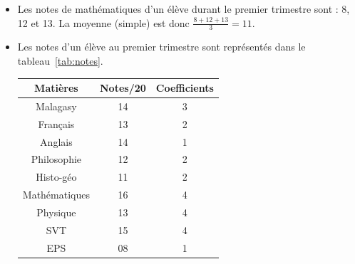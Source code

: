 \begin{defi}
\begin{itemize}
\begin{ex}
\begin{itemize}
                                                      \item Les notes de math\'ematiques d'un \'el\`eve durant le premier 
                                                            trimestre sont : 8, 12 et 13.
                                                            La moyenne (simple) est donc $\frac{8 + 12 + 13}{3} = 11$.
                                                      \item Les notes d'un \'el\`eve au premier trimestre sont repr\'esent\'es
                                                            dans le tableau~\ref{tab:notes}.
                                                            \begin{table}[H]
                                                                  \centering
                                                                  \begin{tabular}{|c|c|c|}
                                                                  \hline
                                                                        Mati\`eres        & Notes/20 & Coefficients \\
                                                                  \hline
                                                                        Malagasy          &    14    &     3        \\
                                                                        Fran\c{c}ais      &    13    &     2        \\
                                                                        Anglais           &    14    &     1        \\
                                                                        Philosophie       &    12    &     2        \\
                                                                        Histo-g\'eo       &    11    &     2        \\
                                                                        Math\'ematiques   &    16    &     4        \\
                                                                        Physique          &    13    &     4        \\
                                                                        SVT               &    15    &     4        \\
                                                                        EPS               &    08    &     1        \\

\end{tabular}
\end{table}
\end{itemize}
\end{ex}
\end{itemize}
\end{defi}
